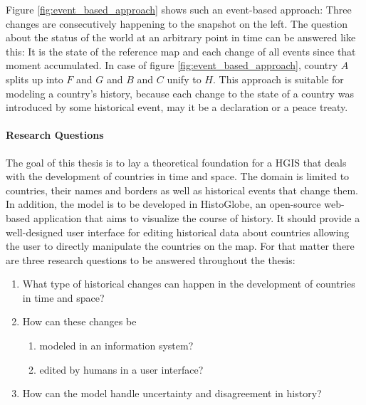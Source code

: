 Figure \ref{fig:event_based_approach} shows such an event-based approach: Three changes are consecutively happening to the snapshot on the left. The question about the status of the world at an arbitrary point in time can be answered like this: It is the state of the reference map and each change of all events since that moment accumulated. In case of figure \ref{fig:event_based_approach}, country $A$ splits up into $F$ and $G$ and $B$ and $C$ unify to $H$. This approach is suitable for modeling a country's history, because each change to the state of a country was introduced by some historical event, may it be a declaration or a peace treaty.

\newpage
\paragraph{Research Questions} %
\label{par:research_questions}

The goal of this thesis is to lay a theoretical foundation for a HGIS that deals with the development of countries in time and space. The domain is limited to countries, their names and borders as well as historical events that change them. In addition, the model is to be developed in HistoGlobe, an open-source web-based application that aims to visualize the course of history. It should provide a well-designed user interface for editing historical data about countries allowing the user to directly manipulate the countries on the map. For that matter there are three research questions to be answered throughout the thesis:

\begin{enumerate}
  \item What type of historical changes can happen in the development of countries in time and space?
  \item How can these changes be
  \begin{enumerate}
    \item modeled in an information system?
    \item edited by humans in a user interface?
  \end{enumerate}
  \item How can the model handle uncertainty and disagreement in history?
\end{enumerate}


